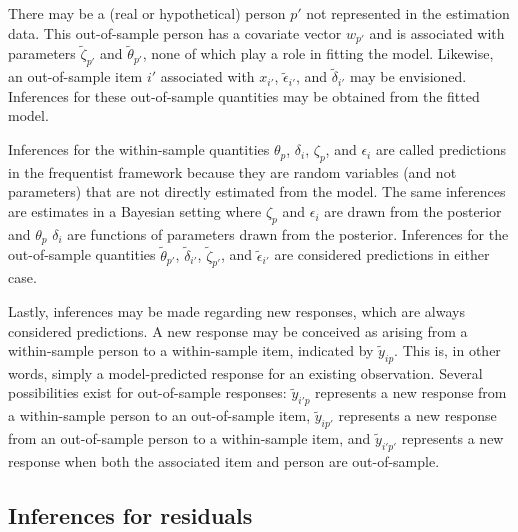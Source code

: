 \documentclass[12pt, letterpaper]{article}
\begin{document}
There may be a (real or hypothetical) person $p'$ not represented in the estimation data. This out-of-sample person has a covariate vector $w_{p'}$ and is associated with parameters $\tilde \zeta_{p'}$ and $\tilde \theta_{p'}$, none of which play a role in fitting the model. Likewise, an out-of-sample item $i'$ associated with $x_{i'}$, $\tilde \epsilon_{i'}$, and $\tilde \delta_{i'}$ may be envisioned. Inferences for these out-of-sample quantities may be obtained from the fitted model.

Inferences for the within-sample quantities $\theta_p$, $\delta_i$, $\zeta_p$, and $\epsilon_i$ are called predictions in the frequentist framework because they are random variables (and not parameters) that are not directly estimated from the model. The same inferences are estimates in a Bayesian setting where $\zeta_p$ and $\epsilon_i$ are drawn from the posterior and $\theta_p$ $\delta_i$ are functions of parameters drawn from the posterior. Inferences for the out-of-sample quantities $\tilde \theta_{p'}$, $\tilde \delta_{i'}$, $\tilde \zeta_{p'}$, and $\tilde \epsilon_{i'}$ are considered predictions in either case.

Lastly, inferences may be made regarding new responses, which are always considered predictions. A new response may be conceived as arising from a within-sample person to a within-sample item, indicated by $\tilde y_{ip}$. This is, in other words, simply a model-predicted response for an existing observation. Several possibilities exist for out-of-sample responses: $\tilde y_{i'p}$ represents a new response from a within-sample person to an out-of-sample item, $\tilde y_{ip'}$ represents a new response from an out-of-sample person to a within-sample item, and $\tilde y_{i'p'}$ represents a new response when both the associated item and person are out-of-sample. 


\subsection{Inferences for residuals}
\end{document}

